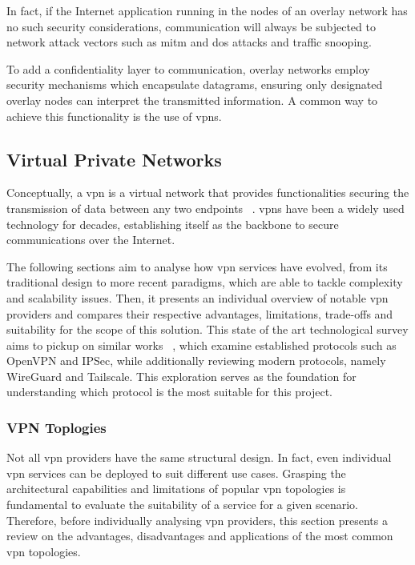 \documentclass[11pt,twoside,a4paper]{report}
\begin{document}
In fact, if the Internet application running in the nodes of an overlay network has no such security considerations, communication will always be subjected to network attack vectors such as \ac{mitm} and \ac{dos} attacks and traffic snooping.

To add a confidentiality layer to communication, overlay networks employ security mechanisms which encapsulate datagrams, ensuring only designated overlay nodes can interpret the transmitted information. A common way to achieve this functionality is the use of \acp{vpn}.

\subsection{Virtual Private Networks}

Conceptually, a \ac{vpn} is a virtual network that provides functionalities  securing the transmission of data between any two endpoints ~\cite{HARMENING2017843}. \acp{vpn} have been a widely used technology for decades, establishing itself as the backbone to secure communications over the Internet.

The following sections aim to analyse how \ac{vpn} services have evolved, from its traditional design to more recent paradigms, which are able to tackle complexity and scalability issues. Then, it presents an individual overview of notable \ac{vpn} providers and compares their respective advantages, limitations, trade-offs and suitability for the scope of this solution. This state of the art technological survey aims to pickup on similar works ~\cite{zuqueteseguranca, berger2006analysis}, which examine established protocols such as OpenVPN and IPSec, while additionally reviewing modern protocols, namely WireGuard and Tailscale. This exploration serves as the foundation for understanding which protocol is the most suitable for this project.


\iffalse
\subsubsection{VPN Toplogies}

Not all \ac{vpn} providers have the same structural design. In fact, even individual \ac{vpn} services can be deployed to suit different use cases. Grasping the architectural capabilities and limitations of popular \ac{vpn} topologies is fundamental to evaluate the suitability of a service for a given scenario. Therefore, before individually analysing \ac{vpn} providers, this section presents a review on the advantages, disadvantages and applications of the most common \ac{vpn} topologies.
\end{document}
